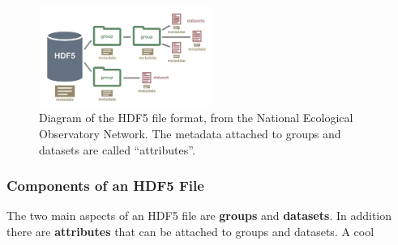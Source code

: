\documentclass[10pt]{exam}
\begin{document}
			\begin{figure}[h]
				\centering
				\includegraphics[width=0.5\textwidth]{hdf5_structure4}
				\caption{Diagram of the HDF5 file format, from the National Ecological Observatory Network. The metadata attached to groups and datasets are called ``attributes''.}
			\end{figure}
	
		\subsubsection{Components of an HDF5 File}	
			\noindent The two main aspects of an HDF5 file are \textbf{groups} and \textbf{datasets}. In addition there are \textbf{attributes} that can be attached to groups and datasets. A cool
\end{document}
